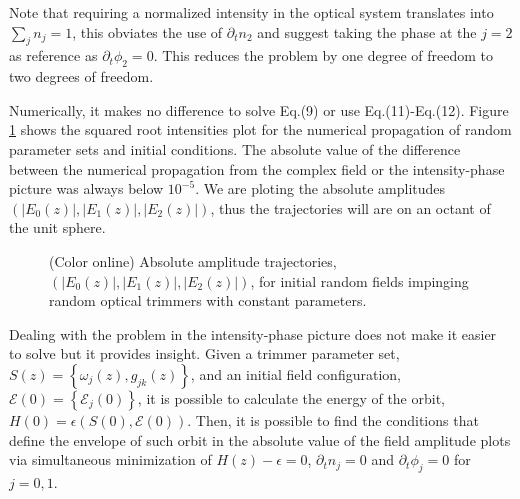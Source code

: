 \documentclass[9pt,twocolumn,twoside]{osajnl}
\begin{document}
Note that requiring a normalized intensity in the optical system translates into $\sum_{j} n_{j} = 1$, this obviates the use of $\partial_{t} n_{2}$ and suggest taking the phase at the $j=2$ as reference as $\partial_{t} \phi_{2} = 0$. This reduces the problem by one degree of freedom to two degrees of freedom.

Numerically, it makes no difference to solve Eq.(9) or use Eq.(11)-Eq.(12).
Figure \ref{fig: Fig2} shows the squared root intensities plot for the numerical propagation of random parameter sets and initial conditions. The absolute value of the difference between the numerical propagation from the complex field or the intensity-phase picture was always below $10^{-5}$.
We are ploting the absolute amplitudes $(\vert E_{0}(z) \vert, \vert E_{1}(z) \vert, \vert E_{2}(z) \vert )$, thus the trajectories will are on an octant of the unit sphere.

\begin{figure}[htbp]
\centering
{}
\caption{(Color online) Absolute amplitude trajectories, $(\vert E_{0}(z) \vert, \vert E_{1}(z) \vert, \vert E_{2}(z) \vert )$, for initial random fields impinging random optical trimmers with constant parameters.}
\label{fig: Fig2}
\end{figure}

Dealing with the problem in the intensity-phase picture does not make it easier to solve but it provides insight.
Given a trimmer parameter set, $S(z) = \left\{ \omega_{j}(z), g_{jk}(z) \right\}$, and an initial field configuration, $\mathcal{E}(0) = \left\{ \mathcal{E}_{j}(0) \right\}$, it is possible to calculate the energy of the orbit, $H(0) = \epsilon\left(S(0), \mathcal{E(0)}\right)$. Then, it is possible to find the conditions that define the envelope of such orbit in the absolute value of the field amplitude plots via simultaneous minimization of $H(z) - \epsilon = 0 $,  $\partial_t n_j = 0$ and $\partial_t \phi_j = 0$ for $j= 0,1$.
\end{document}
